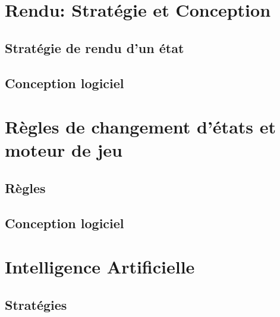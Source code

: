 \documentclass[a4paper,12pt]{article}
\begin{document}
    \clearpage
    \section{Rendu: Stratégie et Conception}

    \subsection{Stratégie de rendu d'un état}


    \subsection{Conception logiciel}


    \clearpage
    \section{Règles de changement d'états et moteur de jeu}

    \subsection{Règles}

    \clearpage
    \subsection{Conception logiciel}




    \section{Intelligence Artificielle}

    \subsection{Stratégies}
\end{document}
